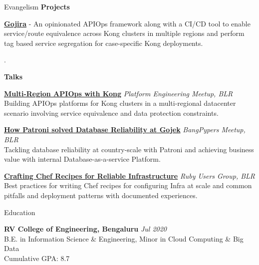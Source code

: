 \documentclass[
	11pt, %
]{resume} %
\begin{document}
\begin{rSection}{Evangelism}
\textbf{Projects}

	\item \href{https://github.com/kumar1202/gojira}{\textbf{Gojira}} - An opinionated APIOps framework along with a CI/CD tool to enable service/route equivalence across Kong clusters in multiple regions and perform tag based service segregation for case-specific Kong deployments.

\hfill \break.
 
 \textbf{Talks}
 
\item \href{https://speakerdeck.com/kumar_abhijeet/multi-region-apiops-with-kong}{\textbf{Multi-Region APIOps with Kong}} \hfill \textit{Platform Engineering Meetup, BLR} \\ 
	Building APIOps platforms for Kong clusters in a multi-regional datacenter scenario involving service equivalence and data protection constraints.

\item \href{https://youtu.be/m3RpZLaq7H4?si=4n0E7gAYt-GP0pHL}{\textbf{How Patroni solved Database Reliability at Gojek}} \hfill \textit{BangPypers Meetup, BLR} \\ 
	Tackling database reliability at country-scale with Patroni and achieving business value with internal Database-as-a-service Platform.

 \item \href{https://youtu.be/6Eap81aTUaA?si=Q5X0WnvMJGHPcZlm}{\textbf{Crafting Chef Recipes for Reliable Infrastructure}} \hfill \textit{Ruby Users Group, BLR} \\ 
	Best practices for writing Chef recipes for configuring Infra at scale and common pitfalls and deployment patterns with documented experiences.

 

\end{rSection}

\begin{rSection}{Education}
	
	\textbf{RV College of Engineering, Bengaluru} \hfill \textit{Jul 2020} \\ 
	B.E. in Information Science \& Engineering, Minor in Cloud Computing \& Big Data \smallskip \\
	Cumulative GPA: 8.7
	
\end{rSection}

\end{document}
